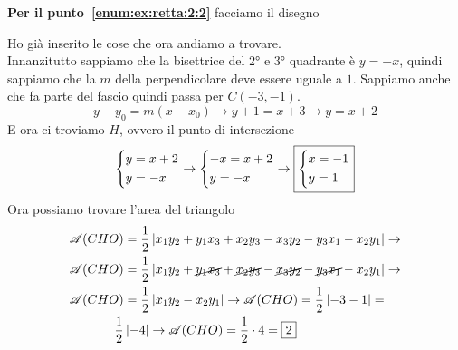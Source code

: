 \textbf{Per il punto~\ref{enum:ex:retta:2:2}} facciamo il disegno
\begin{center}
\end{center}
Ho già inserito le cose che ora andiamo a trovare.\\
Innanzitutto sappiamo che la bisettrice del $\ang{2}$ e $\ang{3}$ quadrante è $y=-x$, quindi sappiamo
che la $m$ della perpendicolare deve essere uguale a $1$. Sappiamo anche che fa parte del fascio 
quindi passa per $C(-3,-1)$.
\begin{equation*}
  y-y_0 = m(x-x_0) \rightarrow y+1 = x+3 \rightarrow \boxed{y = x+2}
\end{equation*}
E ora ci troviamo $H$, ovvero il punto di intersezione
\begin{equation*}
  \begin{dcases}
    y = x+2\\
    y = -x
  \end{dcases} \rightarrow
  \begin{dcases}
    -x = x+2\\
    y = -x
  \end{dcases} \rightarrow
  \boxed{\begin{dcases}
      x = -1\\
      y = 1
  \end{dcases}}
\end{equation*}
Ora possiamo trovare l'area del triangolo
\begin{align*}
  \mathscr{A}(CHO) &= \frac{1}{2}\left\lvert x_1y_2 + y_1x_3 + x_2y_3 -x_3y_2 -y_3x_1-x_2y_1\right\rvert
  \rightarrow\\
  \mathscr{A}(CHO) &= \frac{1}{2}\left\lvert x_1y_2 + \cancel{y_1x_3} + \cancel{x_2y_3} 
  -\cancel{x_3y_2} -\cancel{y_3x_1} -x_2y_1\right\rvert \rightarrow \\
  \mathscr{A}(CHO) &= \frac{1}{2}\left\lvert x_1y_2 -x_2y_1\right\rvert \rightarrow
  \mathscr{A}(CHO) = \frac{1}{2}\left\lvert -3 -1\right\rvert =\\
  \frac{1}{2}&\left\lvert-4\right\rvert \rightarrow \mathscr{A}(CHO) = \frac{1}{2}\cdot4 = \boxed{2}
\end{align*}

